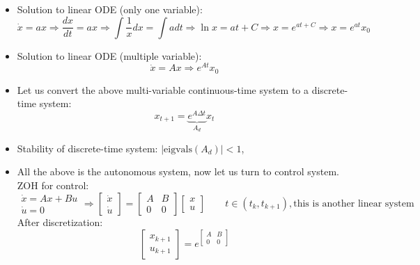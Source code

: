\begin{itemize}
    \item Solution to linear ODE (only one variable):
    \begin{equation}
        \dot{x} =ax\Rightarrow \frac{dx}{dt} =ax\Rightarrow \int \frac{1}{x} dx=\int adt\Rightarrow \ln x=at+C\Rightarrow x=e^{at+C} \Rightarrow x=e^{at} x_{0}
    \end{equation}
    \item Solution to linear ODE (multiple variable):
    \begin{equation}
        \dot{x} =Ax\Rightarrow e^{At} x_{0}
    \end{equation}
    \item Let us convert the above multi-variable continuous-time system to a discrete-time system:
    \begin{equation}
        x_{t+1}= \underbrace{e^{A\Delta t}}_{A_d} x_t
    \end{equation}
    \item Stability of discrete-time system: $\left|\text{eigvals}(A_d)\right|<1$,
    \item All the above is the autonomous system, now let us turn to control system. ZOH for control:
    \begin{equation}
        \begin{matrix}
        \dot{x} =Ax+Bu\\
        \dot{u} =0
        \end{matrix} \Rightarrow \begin{bmatrix}
        \dot{x}\\
        \dot{u}
        \end{bmatrix} =\begin{bmatrix}
        A & B\\
        0 & 0
        \end{bmatrix}\begin{bmatrix}
        x\\
        u
        \end{bmatrix} \qquad t\in\left(t_k, t_{k+1}\right), \text{this is another linear system}
    \end{equation}
    After discretization:
    \begin{equation}
        \begin{bmatrix}
        x_{k+1}\\
        u_{k+1}
        \end{bmatrix} =e^{\begin{bmatrix}
        A & B\\
        0 & 0

\end{bmatrix}}
\end{equation}
\end{itemize}
